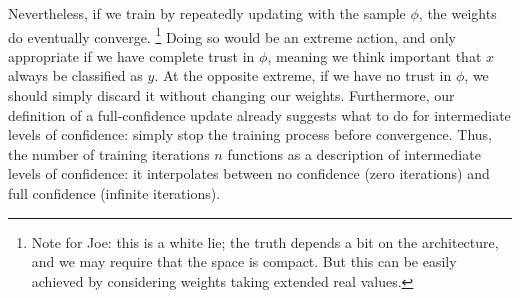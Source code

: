 \begin{example}
Nevertheless, 
if we train by repeatedly updating with the sample $\phi$, 
the weights do eventually converge.%
\footnote{Note for Joe: this is a white lie; the truth depends a bit on the architecture, and we may require that the space is compact. But this can be easily achieved by considering weights taking extended real values.}
Doing so would be an extreme action, and only appropriate if we have complete trust in $\phi$, meaning we think important that $x$ always be classified as $y$.
At the opposite extreme, if we have no trust in $\phi$, we should simply discard it without changing our weights. 
Furthermore, our definition of a full-confidence update 
already suggests what to do for intermediate levels of confidence: simply stop the training process before convergence.
Thus, the number of training iterations $n$ 
functions as a description of 
intermediate levels of confidence: it interpolates
between no confidence (zero iterations) and full confidence (infinite iterations).


\end{example}
